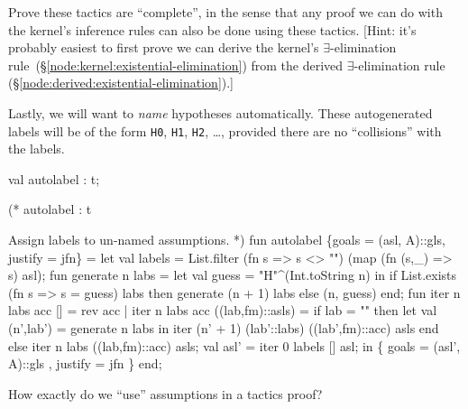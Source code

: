 \begin{xca}
Prove these tactics are ``complete'', in the sense that any proof we
can do with the kernel's inference rules can also be done using these
tactics. [Hint: it's probably easiest to first prove we can derive the kernel's $\exists$-elimination rule~(\S\ref{node:kernel:existential-elimination}) from the derived $\exists$-elimination rule (\S\ref{node:derived:existential-elimination}).]
\end{xca}

\begin{node}
Lastly, we will want to \emph{name} hypotheses automatically. These
autogenerated labels will be of the form \texttt{H0}, \texttt{H1},
\texttt{H2}, \dots, provided there are no ``collisions'' with the labels.
\end{node}

\nwenddocs{}\plusendmoddef\nwstartdeflinemarkup{}\nwenddeflinemarkup
val autolabel : t;
\nwendcode{}\nwdocspar

\nwenddocs{}\plusendmoddef\nwstartdeflinemarkup{}\nwenddeflinemarkup
(* autolabel : t

Assign labels to un-named assumptions. *)
fun autolabel \{goals = (asl, A)::gls, justify = jfn\} =
  let
    val labels = List.filter (fn s => s <> "")
                             (map (fn (s,_) => s) asl);
    fun generate n labs =
      let val guess = "H"^(Int.toString n)
      in if List.exists (fn s => s = guess) labs
         then generate (n + 1) labs
         else (n, guess)
      end;
    fun iter n labs acc [] = rev acc
      | iter n labs acc ((lab,fm)::asls) =
          if lab = ""
          then let val (n',lab') = generate n labs
               in iter (n' + 1) (lab'::labs) ((lab',fm)::acc) asls end
          else iter n labs ((lab,fm)::acc) asls;
    val asl' = iter 0 labels [] asl;
  in
    \{ goals = (asl', A)::gls
    , justify = jfn \}
  end;
\eatline
{}\nwendcode{}\nwdocspar
\begin{problem}
How exactly do we ``use'' assumptions in a tactics proof?
\end{problem}

